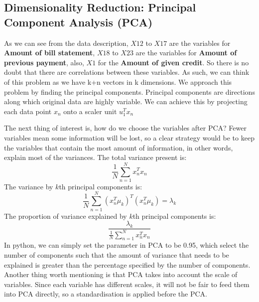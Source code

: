 \documentclass{article}
\begin{document}
\subsection{Dimensionality Reduction: Principal Component Analysis (PCA)}
As we can see from the data description, $X12$ to $X17$ are the variables for \textbf{Amount of bill statement}, $X18$ to $X23$ are the variables for \textbf{Amount of previous payment}, also, $X1$ for the \textbf{Amount of given credit}. So there is no doubt that there are correlations between these variables. As such, we can think of this problem as we have k+n vectors in k dimensions. We approach this problem by finding the principal components. Principal components are directions along which original data are highly variable. We can achieve this by projecting each data point $x_n$ onto a scaler unit $u_{1}^{T}x_n$ 

The next thing of interest is, how do we choose the variables after PCA? Fewer variables mean some information will be lost, so a clear strategy would be to keep the variables that contain the most amount of information, in other words, explain most of the variances.
The total variance present is:
\begin{equation}
\frac{1}{N} \sum_{n=1}^{N} x_{n}^{T} x_{n}
\end{equation}
The variance by $k$th principal components is:
\begin{equation}
\frac{1}{N}\sum_{n=1}^{N}(x_{n}^{T}\mu_{k})^{T}(x_{n}^{T}\mu_{k})=\lambda_k
\end{equation}
The proportion of variance explained by $k$th principal components is:
\begin{equation}
\frac{\lambda_k}{\frac{1}{N}\sum_{n=1}^{N}x_{n}^{T}x_{n}}
\end{equation}
In python, we can simply set the parameter in PCA to be 0.95, which select the number of components such that the amount of variance that needs to be explained is greater than the percentage specified by the number of components.
Another thing worth mentioning is that PCA takes into account the scale of variables. Since each variable has different scales, it will not be fair to feed them into PCA directly, so a standardisation is applied before the PCA.
\end{document}
